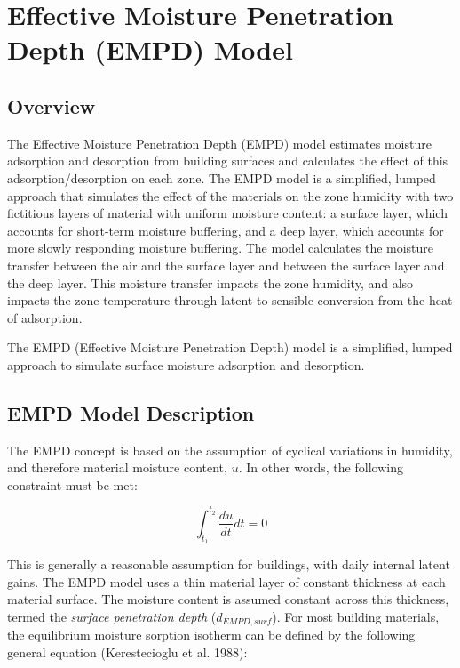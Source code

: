 \section{Effective Moisture Penetration Depth (EMPD) Model}\label{effective-moisture-penetration-depth-empd-model}

\subsection{Overview}\label{overview-014}

The Effective Moisture Penetration Depth (EMPD) model estimates moisture adsorption and desorption from building surfaces and calculates the effect of this adsorption/desorption on each zone. The EMPD model is a simplified, lumped approach that simulates the effect of the materials on the zone humidity with two fictitious layers of material with uniform moisture content: a surface layer, which accounts for short-term moisture buffering, and a deep layer, which accounts for more slowly responding moisture buffering. The model calculates the moisture transfer between the air and the surface layer and between the surface layer and the deep layer. This moisture transfer impacts the zone humidity, and also impacts the zone temperature through latent-to-sensible conversion from the heat of adsorption.

The EMPD (Effective Moisture Penetration Depth) model is a simplified, lumped approach to simulate surface moisture adsorption and desorption.

\subsection{EMPD Model Description}\label{empd-model-description}

The EMPD concept is based on the assumption of cyclical variations in humidity, and therefore material moisture content, $u$. In other words, the following constraint must be met:

\begin{equation}
\int_{{t_1}}^{{t_2}} {\frac{{du}}{{dt }}} dt  = 0
\end{equation}

This is generally a reasonable assumption for buildings, with daily internal latent gains. The EMPD model uses a thin material layer of constant thickness at each material surface. The moisture content is assumed constant across this thickness, termed the \emph{surface penetration depth} ($d_{EMPD,surf}$). For most building materials, the equilibrium moisture sorption isotherm can be defined by the following general equation (Kerestecioglu et al. 1988):

